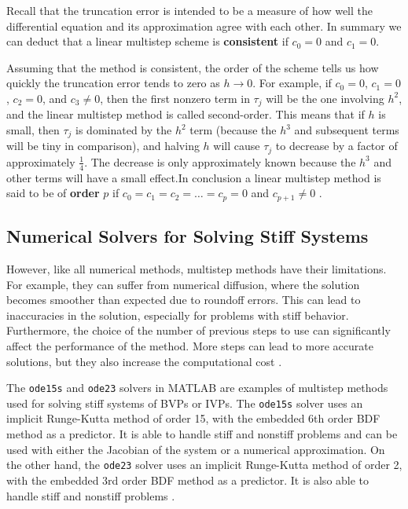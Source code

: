 Recall that the truncation error is intended to be a measure of how well the differential equation and its approximation agree with each other\cite{HELM2008NumericalIVP}. In summary we can deduct that a linear multistep scheme is \textbf{consistent} if $c_0 = 0$ and $c_1 = 0$.


Assuming that the method is consistent, the order of the scheme tells us how quickly the truncation error tends to zero as $h \rightarrow 0$. For example, if $c_0 = 0$, $c_1 = 0$, $c_2 = 0$, and $c_3 \neq 0$, then the first nonzero term in $\tau_j$ will be the one involving $h^2$, and the linear multistep method is called second-order. This means that if $h$ is small, then $\tau_j$ is dominated by the $h^2$ term (because the $h^3$ and subsequent terms will be tiny in comparison), and halving $h$ will cause $\tau_j$ to decrease by a factor of approximately $\frac{1}{4}$. The decrease is only approximately known because the $h^3$ and other terms will have a small effect.In conclusion a linear multistep method is said to be of \textbf{order} $p$ if $c_0 = c_1 = c_2 = \ldots = c_p = 0$ and $c_{p+1} \neq 0$ \cite{HELM2008NumericalIVP}.




\subsection*{Numerical Solvers for Solving Stiff Systems}

However, like all numerical methods, multistep methods have their limitations. For example, they can suffer from numerical diffusion, where the solution becomes smoother than expected due to roundoff errors. This can lead to inaccuracies in the solution, especially for problems with stiff behavior. Furthermore, the choice of the number of previous steps to use can significantly affect the performance of the method. More steps can lead to more accurate solutions, but they also increase the computational cost \cite{math7121158}.

The \texttt{ode15s} and \texttt{ode23} solvers in MATLAB are examples of multistep methods used for solving stiff systems of BVPs or IVPs. The \texttt{ode15s} solver uses an implicit Runge-Kutta method of order 15, with the embedded 6th order BDF method as a predictor. It is able to handle stiff and nonstiff problems and can be used with either the Jacobian of the system or a numerical approximation. On the other hand, the \texttt{ode23} solver uses an implicit Runge-Kutta method of order 2, with the embedded 3rd order BDF method as a predictor. It is also able to handle stiff and nonstiff problems \cite{wong2020lecture}.

